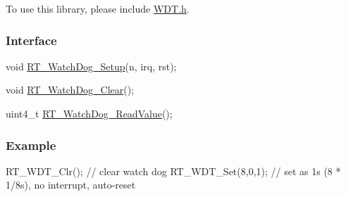 To use this library, please include {\ttfamily \mbox{\hyperlink{a00059}{W\+D\+T.\+h}}}.

\subsubsection*{Interface}


\begin{DoxyCode}
\textcolor{keywordtype}{void} \mbox{\hyperlink{a00059_a369b51538a0ccf57dcdb30e12352a8c7}{RT\_WatchDog\_Setup}}(n, irq, rst);

\textcolor{keywordtype}{void} \mbox{\hyperlink{a00059_ae976b2fe76d4b216e68a771068434abc}{RT\_WatchDog\_Clear}}();

uint4\_t \mbox{\hyperlink{a00059_acdfc8b8f0bddfd7382d49a22a92a5930}{RT\_WatchDog\_ReadValue}}();
\end{DoxyCode}


\subsubsection*{Example}


\begin{DoxyCode}
RT\_WDT\_Clr();       \textcolor{comment}{// clear watch dog}
RT\_WDT\_Set(8,0,1);  \textcolor{comment}{// set as 1s (8 * 1/8s), no interrupt, auto-reset}
\end{DoxyCode}
 